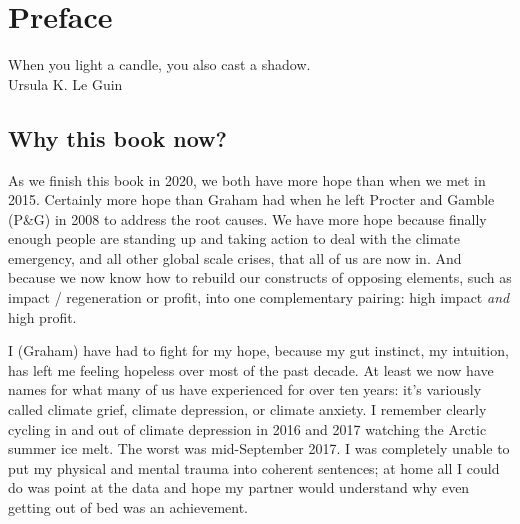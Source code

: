 \chapter{Preface}
\label{chapter:preface}




\begin{chapterquotation}
When you light a candle, you also cast a shadow.\\
\raggedleft\textemdash Ursula K. Le Guin
\end{chapterquotation}






\section*{Why this book now?}
As we finish this book in 2020, we both have more hope than when we met in 2015. Certainly more hope than Graham had when he left Procter and Gamble (P\&G) in 2008 to address the root causes. We have more hope because finally enough people are standing up and taking action to deal with the climate emergency, and all other global scale crises, that all of us are now in\cite{ten-signs-climate}. And because we now know how to rebuild our constructs of opposing elements, such as impact / regeneration or profit, into one complementary pairing: high impact \emph{and} high profit.


\begin{longstoryblock}
I (Graham) have had to fight for my hope, because my gut instinct, my intuition, has left me feeling hopeless over most of the past decade. At least we now have names for what many of us have experienced for over ten years: it’s variously called climate grief, climate depression, or climate anxiety. I remember clearly cycling in and out of climate depression in 2016 and 2017 watching the Arctic  summer ice melt. The worst was mid-September 2017. I was completely unable to put my physical and mental trauma into coherent sentences; at home all I could do was point at the data and hope my partner would understand why even getting out of bed was an achievement. 
\end{longstoryblock}


